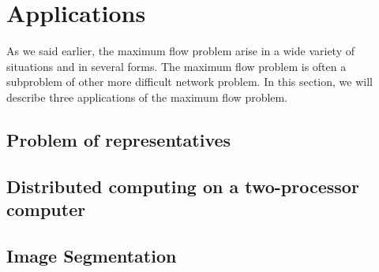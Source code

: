\section{Applications}
\label{sec:applications}
As we said earlier, the maximum flow problem arise in a wide variety of situations and in several forms. The maximum flow problem is often a subproblem of other more difficult network problem. In this section, we will describe three applications of the maximum flow problem.

\subsection{Problem of representatives}

\subsection{Distributed computing on a two-processor computer}

\subsection{Image Segmentation}

